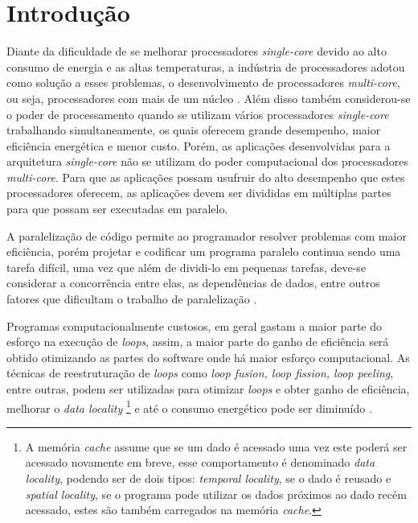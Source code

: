 \chapter{Introdução}

Diante da  dificuldade de se melhorar processadores \textit{single-core} devido 
ao alto consumo de energia e as altas temperaturas, a indústria de processadores 
adotou como solução a esses problemas, o desenvolvimento de processadores 
\textit{multi-core}, ou seja, processadores com mais de um núcleo \cite{aapc}. 
Além disso também considerou-se o poder de processamento 
quando se utilizam vários processadores \textit{single-core} trabalhando 
simultaneamente, os quais oferecem grande desempenho, maior eficiência energética 
e menor custo.
Porém, as aplicações desenvolvidas para a arquitetura \textit{single-core} não 
se utilizam do poder computacional dos processadores \textit{multi-core}.
Para que as aplicações possam usufruir do alto desempenho que estes processadores 
oferecem, as aplicações devem ser divididas em múltiplas partes para que possam 
ser executadas em paralelo.

A paralelização de código permite ao programador resolver problemas com maior 
eficiência, porém projetar e codificar um programa paralelo continua sendo uma 
tarefa difícil, uma vez que além de dividi-lo em pequenas tarefas, deve-se 
considerar a concorrência entre elas, as dependências de dados, entre outros 
fatores que dificultam o trabalho de paralelização \cite{aipp}.

Programas computacionalmente custosos, em geral gastam a maior parte do esforço 
na execução de \textit{loops}, assim, a maior parte do ganho de eficiência será
obtido otimizando as partes do software onde há maior esforço computacional.
As técnicas de reestruturação de \textit{loops} como \textit{loop 
fusion, loop fission, loop peeling}, entre outras, podem ser utilizadas para
otimizar \textit{loops} e obter ganho de eficiência, melhorar o 
\textit{data locality} 
\footnote{A memória \textit{cache} assume que se um dado é acessado uma vez este 
        poderá ser acessado novamente em breve, esse comportamento é denominado 
                \textit{data locality}, podendo ser de dois tipos:
                \textit{temporal locality}, se o
                dado é reusado e \textit{spatial locality}, se o programa pode utilizar
                os dados próximos ao dado recém acessado, estes são também carregados
                na memória \textit{cache}.
}
e até o consumo energético pode ser diminuído \cite{Liu:2004}.

